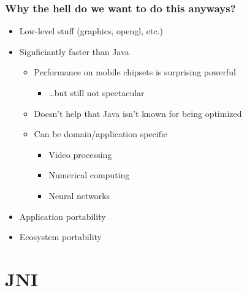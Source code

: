 \documentclass[10pt,mathserif]{beamer}
\begin{document}
	\begin{frame}
		\frametitle{Why the hell do we want to do this anyways?}

		\begin{itemize}
			\item Low-level stuff (graphics, opengl, etc.)
			\item Signficiantly faster than Java
			\begin{itemize}
				\item Performance on mobile chipsets is surprising powerful
				\begin{itemize}
					\item \dots but still not spectacular
				\end{itemize}
				\item Doesn't help that Java isn't known for being optimized
				\item Can be domain/application specific
				\begin{itemize}
					\item Video processing
					\item Numerical computing
					\item Neural networks
				\end{itemize}
			\end{itemize}
			\item Application portability
			\item Ecosystem portability
		\end{itemize}
	\end{frame}


	\section{JNI}
\end{document}
